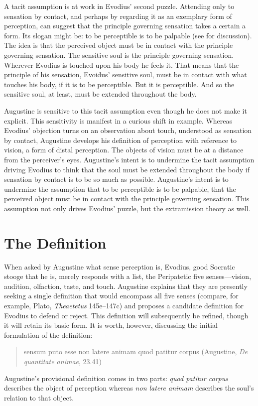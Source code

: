 \documentclass[12pt]{article}
\begin{document}
A tacit assumption is at work in Evodius' second puzzle. Attending only to sensation by contact, and perhaps by regarding it as an exemplary form of perception, can suggest that the principle governing sensation takes a certain a form. Its slogan might be: to be perceptible is to be palpable (see \citealt{Kalderon:2015fr} for discussion). The idea is that the perceived object must be in contact with the principle governing sensation. The sensitive soul is the principle governing sensation. Wherever Evodius is touched upon his body he feels it. That means that the principle of his sensation, Evoidus' sensitive soul, must be in contact with what touches his body, if it is to be perceptible. But it is perceptible. And so the sensitive soul, at least, must be extended throughout the body.

Augustine is sensitive to this tacit assumption even though he does not make it explicit. This sensitivity is manifest in a curious shift in example. Whereas Evodius' objection turns on an observation about touch, understood as sensation by contact, Augustine develops his definition of perception with reference to vision, a form of distal perception. The objects of vision must be at a distance from the perceiver's eyes. Augustine's intent is to undermine the tacit assumption driving Evodius to think that the soul must be extended throughout the body if sensation by contact is to be so much as possible. Augustine's intent is to undermine the assumption that to be perceptible is to be palpable, that the perceived object must be in contact with the principle governing sensation. This assumption not only drives Evodius' puzzle, but the extramission theory as well. 


\section{The Definition} %
\label{sec:the_definition}

When asked by Augustine what sense perception is, Evodius, good Socratic stooge that he is, merely responds with a list, the Peripatetic five senses---vision, audition, olfaction, taste, and touch. Augustine explains that they are presently seeking a single definition that would encompass all five senses (compare, for example, Plato, \emph{Theaetetus} 145e--147c) and proposes a candidate definition for Evodius to defend or reject. This definition will subsequently be refined, though it will retain its basic form. It is worth, however, discussing the initial formulation of the definition: 
\begin{quote}
	sensum puto esse non latere animam quod patitur corpus (Augustine, \emph{De quantitate animae}, 23.41)
\end{quote}
Augustine's provisional definition comes in two parts: \emph{quod patitur corpus} describes the object of perception whereas \emph{non latere animam} describes the soul's relation to that object. 
\end{document}
